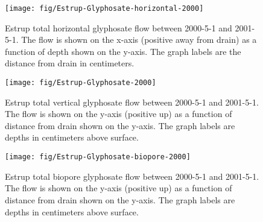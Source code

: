 \begin{figure}[htbp]
  \centering
  \texttt{[image: fig/Estrup-Glyphosate-horizontal-2000]}
  
  \caption{Estrup total horizontal glyphosate flow between 2000-5-1 and
    2001-5-1.  The flow is shown on the x-axis (positive away from
    drain) as a function of depth shown on the y-axis.  The graph
    labels are the distance from drain in centimeters.}
  \label{fig:Estrup-Glyphosate-2000-horizontal}
\end{figure}\FloatBarrier

\begin{figure}[htbp]
  \centering
  \texttt{[image: fig/Estrup-Glyphosate-2000]}
  
  \caption{Estrup total vertical glyphosate flow between 2000-5-1 and
    2001-5-1.  The flow is shown on the y-axis (positive up) as a
    function of distance from drain shown on the y-axis.  The graph
    labels are depths in centimeters above surface.}
  \label{fig:Estrup-Glyphosate-2000}
\end{figure}\FloatBarrier

\begin{figure}[htbp]
  \centering
  \texttt{[image: fig/Estrup-Glyphosate-biopore-2000]}
  
  \caption{Estrup total biopore glyphosate flow between 2000-5-1 and
    2001-5-1.  The flow is shown on the y-axis (positive up) as a
    function of distance from drain shown on the y-axis.  The graph
    labels are depths in centimeters above surface.}
  \label{fig:Estrup-Glyphosate-biopore-2000}
\end{figure}\FloatBarrier

